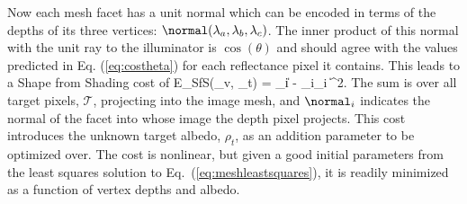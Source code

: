 Now each mesh facet has a unit normal which can be encoded in terms of the depths of its three vertices: $\normal(\lambda_a,\lambda_b,\lambda_c)$.  The inner product of this normal with the unit ray to the illuminator is $\cos(\theta)$ and should agree with the values predicted in Eq. (\ref{eq:costheta}) for each reflectance pixel it contains.  This leads to a Shape from Shading cost of
\beq
E_{SfS}(\vlambda_v, \rho_t) = \sum_{i\in {}}\|  - \normal_i\cdot\ray_i \|^2.
\label{eq:esfs}
\eeq
The sum is over all target pixels, $\mathcal{T}$, projecting into the image mesh, and $\normal_i$ indicates the normal of the facet into whose image the depth pixel projects.  This cost introduces the unknown target albedo, $\rho_t$, as an addition parameter to be optimized over.  The cost is nonlinear, but given a good initial parameters from the least squares solution to Eq.~(\ref{eq:meshleastsquares}), it is readily minimized as a function of vertex depths and albedo.
